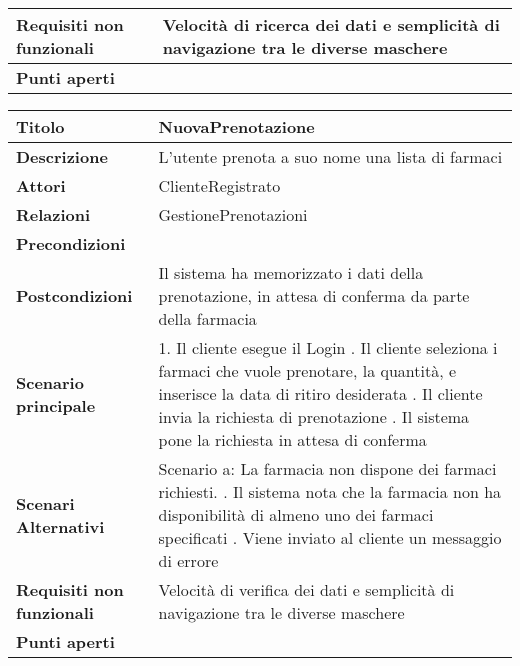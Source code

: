 \begin{tabular} {|P{4.5cm}|P{12.5cm}|}
\hline
  \textbf{Requisiti non funzionali} & Velocità di ricerca dei dati e semplicità di navigazione tra le diverse maschere\\
\hline
  \textbf{Punti aperti} &\\
\hline
\end{tabular}
\hfill
\break

\begin{tabular} {|P{4.5cm}|P{12.5cm}|}
\hline
  \textbf{Titolo} & NuovaPrenotazione\\
\hline
  \textbf{Descrizione} & L'utente prenota a suo nome una lista di farmaci\\
\hline
  \textbf{Attori} & ClienteRegistrato\\
\hline
  \textbf{Relazioni} & GestionePrenotazioni\\
\hline
  \textbf{Precondizioni} &\\
\hline
  \textbf{Postcondizioni} & Il sistema ha memorizzato i dati della prenotazione, in attesa di conferma da parte della farmacia\\
\hline
  \textbf{Scenario principale} & 1. Il cliente esegue il Login . Il cliente seleziona i farmaci che vuole prenotare, la quantità, e inserisce la data di ritiro desiderata . Il cliente invia la richiesta di prenotazione . Il sistema pone la richiesta in attesa di conferma\\
\hline
  \textbf{Scenari Alternativi} & Scenario a: La farmacia non dispone dei farmaci richiesti. . Il sistema nota che la farmacia non ha disponibilità di almeno uno dei farmaci specificati . Viene inviato al cliente un messaggio di errore\\
\hline
  \textbf{Requisiti non funzionali} & Velocità di verifica dei dati e semplicità di navigazione tra le diverse maschere\\
\hline
  \textbf{Punti aperti} &\\
\hline
\end{tabular}
\hfill
\break


